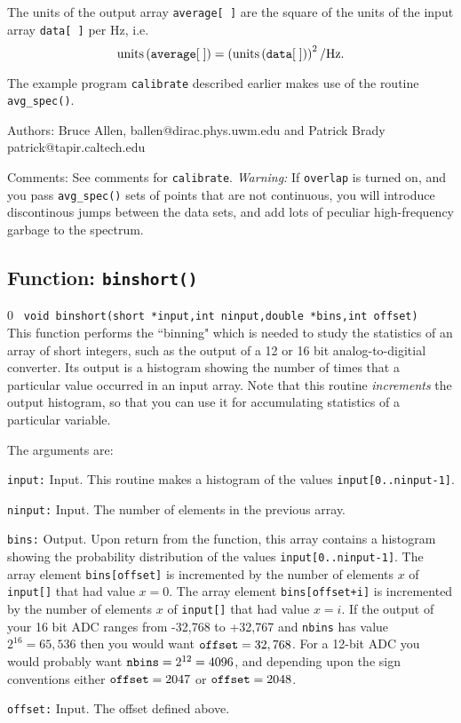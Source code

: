 The units of the output array {\tt average[ ]} are the square of the
units of the input array {\tt data[ ]} per Hz, i.e.
\begin{equation}
{\rm units} \left( {\tt average[\;]} \right) = 
\left( {\rm units}\left( {\tt data[\;]} \right) \right)^2/\rm Hz.
\label{e:powerspecnorm}
\end{equation}

The example program {\tt calibrate} described earlier makes use of the
routine {\tt avg\_spec()}.
\begin{description}
\item{Authors:}
Bruce Allen, ballen@dirac.phys.uwm.edu and
Patrick Brady patrick@tapir.caltech.edu
\item{Comments:}
See comments for {\tt calibrate}.  {\it Warning:} If {\tt overlap}
is turned on, and you pass {\tt avg\_spec()} sets of points that are not
continuous, you will introduce discontinous jumps between the data
sets, and add lots of peculiar high-frequency garbage to the spectrum.
\end{description}
\clearpage

\subsection{Function: {\tt binshort()}}
\setcounter{equation}0
{\tt
void binshort(short *input,int ninput,double *bins,int offset) }\\ This
function performs the ``binning" which is needed to study the
statistics of an array of short integers, such as the output of a 12 or
16 bit analog-to-digitial converter.  Its output is a histogram showing
the number of times that a particular value occurred in an
input array.  Note that this routine {\it increments} the output
histogram, so that you can use it for accumulating statistics of a
particular variable.

The arguments are:
\begin{description}
\item{\tt input:} Input.  This routine makes a histogram of
   the values {\tt input[0..ninput-1]}.
\item{\tt ninput:} Input.  The number of elements in the previous array.
\item{\tt bins:} Output.  Upon return from the function, this array
   contains a histogram showing the probability distribution of the
   values {\tt input[0..ninput-1]}.  The array element {\tt bins[offset]}
   is incremented by the number of elements $x$ of {\tt input[]} that
   had value $x=0$.  The array element {\tt bins[offset+i]}
   is incremented by the number of elements $x$ of {\tt input[]} that
   had value $x=i$.  If the output of your 16 bit ADC
   ranges from -32,768 to +32,767 and {\tt nbins} has
   value $2^{16}=65,536$ then you would want ${\tt offset}=32,768$.
   For a 12-bit ADC you would
   probably want ${\tt nbins}=2^{12}=4096$, and 
  depending upon the sign conventions either ${\tt offset}=2047$
  or ${\tt offset}=2048$.
\item{\tt offset:} Input. The offset defined above.
\end{description}

